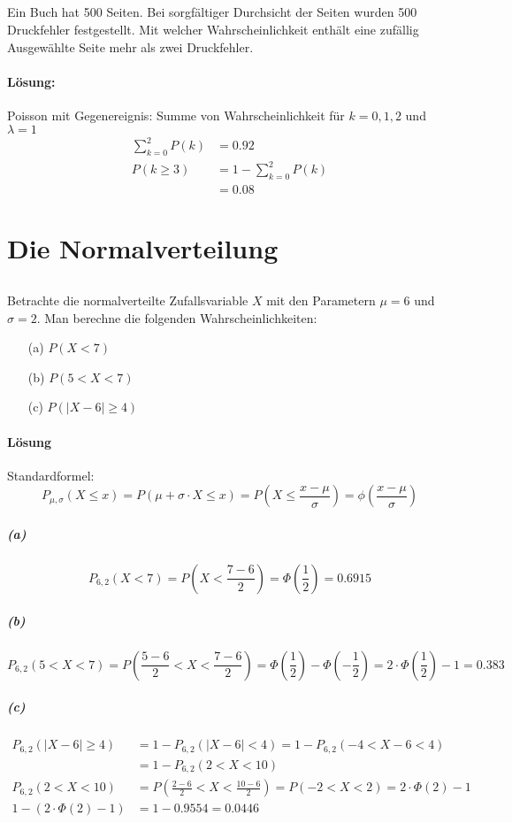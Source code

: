 \documentclass[ngerman]{scrartcl}
\begin{document}
\subsection{}
Ein Buch hat 500 Seiten. Bei sorgfältiger Durchsicht der Seiten wurden 500 Druckfehler festgestellt. Mit welcher Wahrscheinlichkeit enthält eine zufällig Ausgewählte Seite mehr als zwei Druckfehler.
\paragraph{Lösung:}
Poisson mit Gegenereignis: Summe von Wahrscheinlichkeit für $k=0,1,2$ und $\lambda=1$
\begin{align*}
\sum_{k=0}^2{P(k)} &= 0.92 \\
P(k\geq 3) &= 1 - \sum_{k=0}^2{P(k)} \\
&= 0.08
\end{align*}

\section{Die Normalverteilung}
\subsection{}
Betrachte die normalverteilte Zufallsvariable $X$ mit den Parametern $\mu = 6$ und $\sigma=2$. Man berechne die folgenden Wahrscheinlichkeiten:
\begin{enumerate}
\item[(a)] $P(X<7)$
\item[(b)] $P(5<X<7)$
\item[(c)] $P(|X-6| \geq 4)$
\end{enumerate}
\paragraph{Lösung}
Standardformel:
\begin{equation*}
P_{\mu,\sigma}(X \leq x) = P\left(\mu+\sigma\cdot X \leq x\right) = P\left(X \leq \frac{x - \mu}{\sigma}\right) = \phi\left(\frac{x - \mu}{\sigma}\right)
\end{equation*}
\subparagraph{(a)}
\begin{equation*}
P_{6,2}(X<7) = P\left(X < \frac{7 - 6}{2}\right) = \Phi\left(\frac{1}{2}\right) = 0.6915
\end{equation*}
\subparagraph{(b)}
\begin{equation*}
P_{6,2}(5<X<7) = P\left(\frac{5 - 6}{2} < X < \frac{7 - 6}{2}\right) = \Phi\left( \frac{1}{2}\right) - \Phi\left(- \frac{1}{2}\right) = 2\cdot\Phi\left( \frac{1}{2}\right) - 1 = 0.383
\end{equation*}
\subparagraph{(c)}
\begin{align*}
P_{6,2}(|X-6| \geq 4) &= 1 - P_{6,2}(|X-6| < 4) = 1 - P_{6,2}(-4 < X-6 <4) \\
&= 1 - P_{6,2}(2 < X < 10)\\
P_{6,2}(2 < X < 10) &= P\left(\frac{2 - 6}{2} < X < \frac{10 - 6}{2}\right) = P(-2 < X < 2) = 2\cdot \Phi(2) - 1\\
1 - \left(2\cdot \Phi(2) - 1 \right) &= 1 - 0.9554 = 0.0446
\end{align*}
\end{document}
